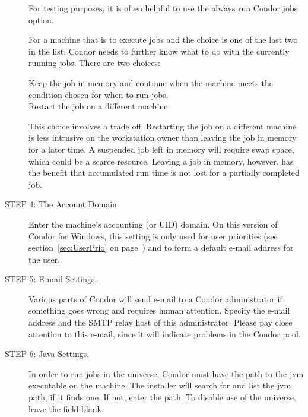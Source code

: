 \begin{description}
     For testing purposes, it is often helpful to use the always run Condor
     jobs option. 

     For a machine that is to execute jobs and the choice is one of
the last two in the list,
Condor needs to further know what to do with the currently running jobs.
There are two choices:
     \begin{description}
     \item[Keep the job in memory and continue when the machine meets
the condition chosen for when to run jobs.]
     \item[Restart the job on a different machine.]
     \end{description}

     This choice involves a trade off.
     Restarting the job on a different machine is less intrusive
     on the workstation owner than leaving the job in memory for a later time.
     A suspended job left in memory will require swap space,
     which could be a scarce resource.
     Leaving a job in memory, however, has the benefit that accumulated
     run time is not lost for a partially completed job.

\item[STEP 4: The Account Domain.]


     Enter the machine's accounting (or UID) domain.
     On this version of Condor for Windows, this setting is only used for user
     priorities (see section~\ref{sec:UserPrio} on
     page~\pageref{sec:UserPrio}) and to form a default e-mail address for
     the user.

\item[STEP 5: E-mail Settings.]

     Various parts of Condor will send e-mail to a Condor administrator
     if something goes wrong and requires human attention.
     Specify the e-mail address and the SMTP relay host
     of this administrator.  Please pay close attention to this e-mail,
     since it will indicate problems in the Condor pool.

\item[STEP 6: Java Settings.]
     In order to run jobs in the  universe,
     Condor must have the path to the jvm executable on the machine.
     The installer will search for and list the jvm path, if it finds one.
     If not, enter the path.
     To disable use of the  universe,
     leave the field blank.


\end{description}
